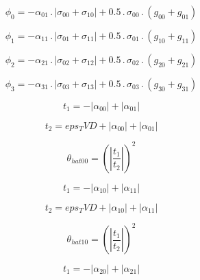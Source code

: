 \documentclass{article}
\begin{document}
\begin{dmath}\phi_{0} = - \alpha_{01} \,.\, \left|{\sigma_{0 0} + \sigma_{1 0}}\right| + 0.5 \,.\, \sigma_{0 0} \,.\, \left(g_{00} + g_{01}\right)\end{dmath}

\begin{dmath}\phi_{1} = - \alpha_{11} \,.\, \left|{\sigma_{0 1} + \sigma_{1 1}}\right| + 0.5 \,.\, \sigma_{0 1} \,.\, \left(g_{10} + g_{11}\right)\end{dmath}

\begin{dmath}\phi_{2} = - \alpha_{21} \,.\, \left|{\sigma_{0 2} + \sigma_{1 2}}\right| + 0.5 \,.\, \sigma_{0 2} \,.\, \left(g_{20} + g_{21}\right)\end{dmath}

\begin{dmath}\phi_{3} = - \alpha_{31} \,.\, \left|{\sigma_{0 3} + \sigma_{1 3}}\right| + 0.5 \,.\, \sigma_{0 3} \,.\, \left(g_{30} + g_{31}\right)\end{dmath}

\begin{dmath}t_{1} = - \left|{\alpha_{00}}\right| + \left|{\alpha_{01}}\right|\end{dmath}

\begin{dmath}t_{2} = eps_TVD + \left|{\alpha_{00}}\right| + \left|{\alpha_{01}}\right|\end{dmath}

\begin{dmath}\theta_{hat 00} = \left(\left|{\frac{t_{1}}{t_{2}}}\right| \right)^{2}\end{dmath}

\begin{dmath}t_{1} = - \left|{\alpha_{10}}\right| + \left|{\alpha_{11}}\right|\end{dmath}

\begin{dmath}t_{2} = eps_TVD + \left|{\alpha_{10}}\right| + \left|{\alpha_{11}}\right|\end{dmath}

\begin{dmath}\theta_{hat 10} = \left(\left|{\frac{t_{1}}{t_{2}}}\right| \right)^{2}\end{dmath}

\begin{dmath}t_{1} = - \left|{\alpha_{20}}\right| + \left|{\alpha_{21}}\right|\end{dmath}
\end{document}
